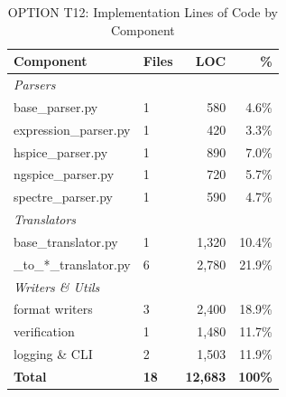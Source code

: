 \documentclass[conference]{IEEEtran}
\begin{document}
\begin{table}[!t]
\caption{OPTION T12: Implementation Lines of Code by Component}
\label{tab:loc_breakdown}
\centering
\renewcommand{\arraystretch}{1.2}
\begin{tabular}{@{}llrr@{}}
\toprule
\textbf{Component} & \textbf{Files} & \textbf{LOC} & \textbf{\%} \\
\midrule
\multicolumn{4}{l}{\textit{Parsers}} \\
\quad base\_parser.py & 1 & 580 & 4.6\% \\
\quad expression\_parser.py & 1 & 420 & 3.3\% \\
\quad hspice\_parser.py & 1 & 890 & 7.0\% \\
\quad ngspice\_parser.py & 1 & 720 & 5.7\% \\
\quad spectre\_parser.py & 1 & 590 & 4.7\% \\
\midrule
\multicolumn{4}{l}{\textit{Translators}} \\
\quad base\_translator.py & 1 & 1,320 & 10.4\% \\
\quad *\_to\_*\_translator.py & 6 & 2,780 & 21.9\% \\
\midrule
\multicolumn{4}{l}{\textit{Writers \& Utils}} \\
\quad format writers & 3 & 2,400 & 18.9\% \\
\quad verification & 1 & 1,480 & 11.7\% \\
\quad logging \& CLI & 2 & 1,503 & 11.9\% \\
\midrule
\textbf{Total} & \textbf{18} & \textbf{12,683} & \textbf{100\%} \\
\bottomrule
\end{tabular}
\end{table}
\end{document}

